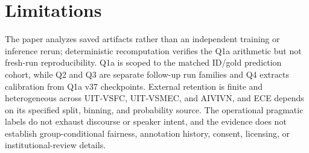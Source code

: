 \section{Limitations}

The paper analyzes saved artifacts rather than an independent training or inference rerun; deterministic recomputation verifies the Q1a arithmetic but not fresh-run reproducibility. Q1a is scoped to the matched ID/gold prediction cohort, while Q2 and Q3 are separate follow-up run families and Q4 extracts calibration from Q1a v37 checkpoints. External retention is finite and heterogeneous across UIT-VSFC, UIT-VSMEC, and AIVIVN, and ECE depends on its specified split, binning, and probability source. The operational pragmatic labels do not exhaust discourse or speaker intent, and the evidence does not establish group-conditional fairness, annotation history, consent, licensing, or institutional-review details.
